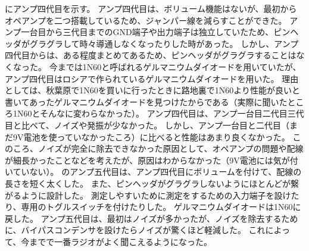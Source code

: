 \documentclass[report.tex]{subfiles}
\begin{document}
にアンプ四代目を示す。
アンプ四代目は、ボリューム機能はないが、最初からオペアンプを二つ搭載しているため、ジャンパー線を減らすことができた。
アンプ一台目から三代目までのGND端子や出力端子は独立していたため、ピンヘッダがグラグラして時々導通しなくなったりした時があった。
しかし、アンプ四代目からは、ある程度まとめてあるため、ピンヘッダがグラグラすることはなくなった。
今までは1N60と呼ばれるゲルマニウムダイオードを用いていたが、アンプ四代目はロシアで作られているゲルマニウムダイオードを用いた。
理由としては、秋葉原で1N60を買いに行ったときに路地裏で1N60より性能が良いと書いてあったゲルマニウムダイオードを見つけたからである（実際に聞いたところ1N60とそんなに変わらなかった）。
アンプ四代目は、アンプ一台目二代目三代目と比べて、ノイズや発振が少なかった。
しかし、アンプ一台目と二代目（まだ9V電池を使っていなかったころ）に比べると性能はあまり良くなかった。
このころ、ノイズが完全に除去できなかった原因として、オペアンプの問題や配線が細長かったことなどを考えたが、原因はわからなかった（9V電池には気が付いていない）。
のアンプ五代目は、アンプ四代目にボリュームを付けて、配線の長さを短く太くした。
また、ピンヘッダがグラグラしないようにほとんどが繋がるように設計した。
測定しやすいために測定をするための入力端子を設けたり、専用のトグルスイッチを付けたりした。
ゲルマニウムダイオードは1N60に戻した。
アンプ五代目は、最初はノイズが多かったが、ノイズを除去するために、バイパスコンデンサを設けたらノイズが驚くほど軽減した。
これによって、今までで一番ラジオがよく聞こえるようになった。
\end{document}
